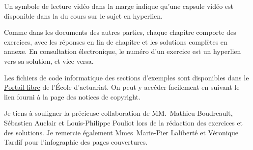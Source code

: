 Un symbole de lecture vidéo dans la marge indique qu'une capsule vidéo
est disponible dans la %
du cours sur le sujet en hyperlien.

Comme dans les documents des autres parties, chaque chapitre comporte
des exercices, avec les réponses en fin de chapitre et les solutions
complètes en annexe. En consultation électronique, le numéro d'un
exercice est un hyperlien vers sa solution, et vice versa.

Les fichiers de code informatique des sections d'exemples sont
disponibles dans le %
\href{http://libre.act.ulaval.ca/}{Portail libre} %
de l'École d'actuariat. On peut y accéder facilement en suivant le
lien fourni à la page des notices de copyright.

Je tiens à souligner la précieuse collaboration de MM.~Mathieu
Boudreault, Sébastien Auclair et Louis-Philippe Pouliot lors de la
rédaction des exercices et des solutions. Je remercie également
Mmes~Marie-Pier Laliberté et Véronique Tardif pour l'infographie des
pages couvertures.


